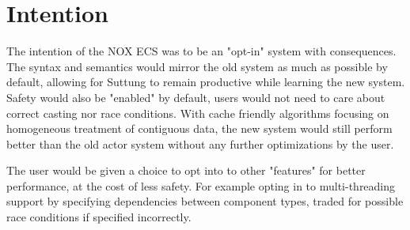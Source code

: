 \section{Intention}
\label{subsec:high_level_intention}
The intention of the NOX ECS was to be an "opt-in" system with consequences.
The syntax and semantics would mirror the old system as much as possible by default, allowing for Suttung to remain productive while learning the new system.
Safety would also be "enabled" by default, users would not need to care about correct casting nor race conditions.
With cache friendly algorithms focusing on homogeneous treatment of contiguous data,
the new system would still perform better than the old actor system without any further optimizations by the user.

The user would be given a choice to opt into to other "features" for better performance, at the cost of less safety.
For example opting in to multi-threading support by specifying dependencies between component types, traded for possible
race conditions if specified incorrectly.
